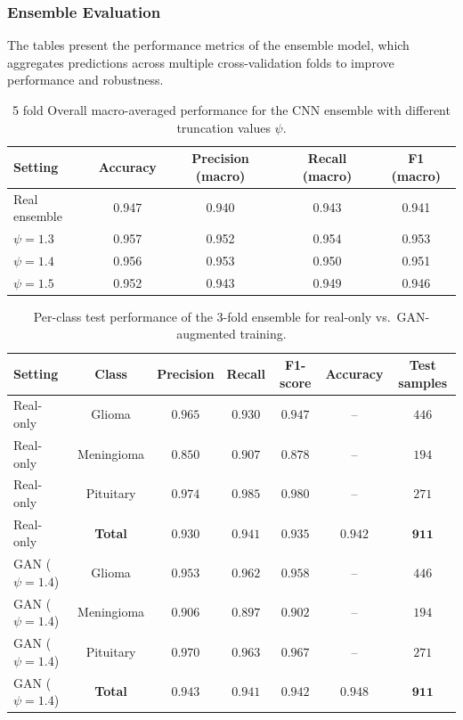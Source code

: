 \subsubsection{Ensemble Evaluation}

The tables present the performance metrics of the ensemble model, which aggregates predictions across multiple cross-validation folds to improve performance and robustness.


\begin{table}[H]
    \centering
    \caption{5 fold Overall macro-averaged performance for the CNN ensemble with different truncation values $\psi$.}
    \label{tab:macro_overall_truncation}
    \begin{tabular}{lcccc}
        \toprule
        Setting        & Accuracy & Precision (macro) & Recall (macro) & F1 (macro) \\
        \midrule
        Real ensemble  & 0.947 & 0.940 & 0.943 & 0.941 \\
        $\psi = 1.3$   & 0.957 & 0.952 & 0.954 & 0.953 \\
        $\psi = 1.4$   & 0.956 & 0.953 & 0.950 & 0.951 \\
        $\psi = 1.5$   & 0.952 & 0.943 & 0.949 & 0.946 \\
        \bottomrule
    \end{tabular}
\end{table}

\begin{table}[H]
\centering
\caption{Per-class test performance of the 3-fold ensemble for real-only vs.\ GAN-augmented training.}
\label{tab:test_ensemble_per_class_3fold_real_vs_gan}
\begin{tabular}{lcccccc}
\toprule
Setting      & Class       & Precision & Recall & F1-score & Accuracy & Test samples \\
\midrule
Real-only    & Glioma      & $0.965$ & $0.930$ & $0.947$ & --      & $446$ \\
Real-only    & Meningioma  & $0.850$ & $0.907$ & $0.878$ & --      & $194$ \\
Real-only    & Pituitary   & $0.974$ & $0.985$ & $0.980$ & --      & $271$ \\
Real-only    & \textbf{Total}
             & $\mathbf{0.930}$ & $\mathbf{0.941}$ & $\mathbf{0.935}$ & $\mathbf{0.942}$ & $\mathbf{911}$ \\
\midrule
GAN ($\psi=1.4$) & Glioma     & $0.953$ & $0.962$ & $0.958$ & --      & $446$ \\
GAN ($\psi=1.4$) & Meningioma & $0.906$ & $0.897$ & $0.902$ & --      & $194$ \\
GAN ($\psi=1.4$) & Pituitary  & $0.970$ & $0.963$ & $0.967$ & --      & $271$ \\
GAN ($\psi=1.4$) & \textbf{Total}
             & $\mathbf{0.943}$ & $\mathbf{0.941}$ & $\mathbf{0.942}$ & $\mathbf{0.948}$ & $\mathbf{911}$ \\
\bottomrule
\end{tabular}
\end{table}

